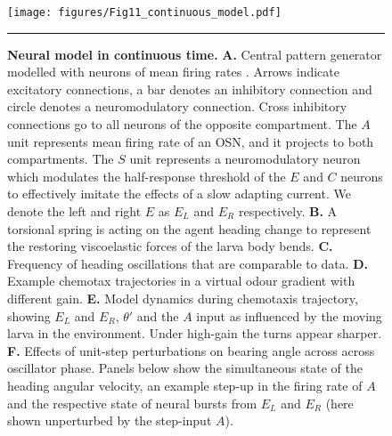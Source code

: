 \documentclass[11pt,a4paper]{article}
\newcommand{\todoBW}[1]{\todo[author=BW,color=orange, size=\tiny,inline]{#1}}
\begin{document}
\begin{figure}
\begin{center}
\texttt{[image: figures/Fig11\_continuous\_model.pdf]}
\caption{{\bf Neural model in continuous time.} {\bf A.} Central pattern generator modelled with neurons of mean firing rates  \citep[adapted from ][]{wilson1999spikes}.
  Arrows indicate excitatory connections, a bar denotes an inhibitory connection and circle denotes a neuromodulatory connection. Cross inhibitory connections go to all neurons of the opposite compartment.
   The $A$ unit represents mean firing rate of an OSN, and it projects to both compartments.
   The $S$ unit represents a neuromodulatory neuron which  modulates the half-response threshold of the $E$ and $C$ neurons  to effectively imitate the effects of a slow adapting current. We denote the left and right $E$ as $E_L$ and $E_R$ respectively.
{\bf B.} A torsional spring is acting on the agent heading change to represent the restoring viscoelastic forces of the larva body bends.
{\bf C.} Frequency of heading oscillations that are comparable to data.
{\bf D.} Example chemotax trajectories in a virtual odour gradient with different gain.
{\bf E.} Model dynamics during chemotaxis trajectory, showing $E_L$ and  $E_R$, $\theta'$ and the $A$ input as influenced by the moving larva in the environment. Under high-gain the turns appear sharper.
{\bf F.} Effects of unit-step perturbations on bearing angle across across oscillator phase.
 Panels below show the simultaneous state of the heading angular velocity, an example step-up in the firing rate of $A$ and the respective state of neural bursts from $E_L$ and $E_R$ (here shown unperturbed by the step-input $A$).
\label{fig:LampreyModel}}
\hrule
\end{center}
\end{figure}
\end{document}
